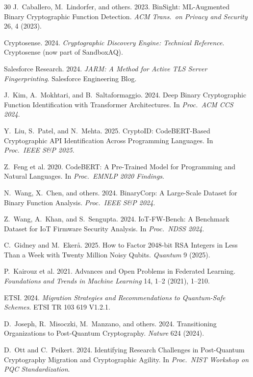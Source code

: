 \documentclass[sigconf,nonacm]{acmart}
\begin{document}
\begin{thebibliography}{30}
J.~Caballero, M.~Lindorfer, and others. 2023. BinSight: ML-Augmented
Binary Cryptographic Function Detection.
\textit{ACM Trans.\ on Privacy and Security} 26, 4 (2023).

Cryptosense. 2024. \textit{Cryptographic Discovery Engine: Technical
Reference}. Cryptosense (now part of SandboxAQ).

Salesforce Research. 2024. \textit{JARM: A Method for Active TLS Server
Fingerprinting}. Salesforce Engineering Blog.

J.~Kim, A.~Mokhtari, and B.~Saltaformaggio. 2024. Deep Binary
Cryptographic Function Identification with Transformer Architectures.
In \textit{Proc.\ ACM CCS 2024}.

Y.~Liu, S.~Patel, and N.~Mehta. 2025. CryptoID: CodeBERT-Based
Cryptographic API Identification Across Programming Languages.
In \textit{Proc.\ IEEE S\&P 2025}.

Z.~Feng et al. 2020. CodeBERT: A Pre-Trained Model for Programming
and Natural Languages. In \textit{Proc.\ EMNLP 2020 Findings}.

N.~Wang, X.~Chen, and others. 2024. BinaryCorp: A Large-Scale
Dataset for Binary Function Analysis. \textit{Proc.\ IEEE S\&P 2024}.

Z.~Wang, A.~Khan, and S.~Sengupta. 2024. IoT-FW-Bench: A Benchmark
Dataset for IoT Firmware Security Analysis. In
\textit{Proc.\ NDSS 2024}.

C.~Gidney and M.~Eker\aa{}. 2025. How to Factor 2048-bit RSA
Integers in Less Than a Week with Twenty Million Noisy Qubits.
\textit{Quantum} 9 (2025).

P.~Kairouz et al. 2021. Advances and Open Problems in Federated
Learning. \textit{Foundations and Trends in Machine Learning} 14, 1--2
(2021), 1--210.

ETSI. 2024. \textit{Migration Strategies and Recommendations to
Quantum-Safe Schemes}. ETSI TR 103 619 V1.2.1.

D.~Joseph, R.~Misoczki, M.~Manzano, and others. 2024. Transitioning
Organizations to Post-Quantum Cryptography. \textit{Nature} 624 (2024).

D.~Ott and C.~Peikert. 2024. Identifying Research Challenges in
Post-Quantum Cryptography Migration and Cryptographic Agility.
In \textit{Proc.\ NIST Workshop on PQC Standardization}.


\end{thebibliography}
\end{document}
